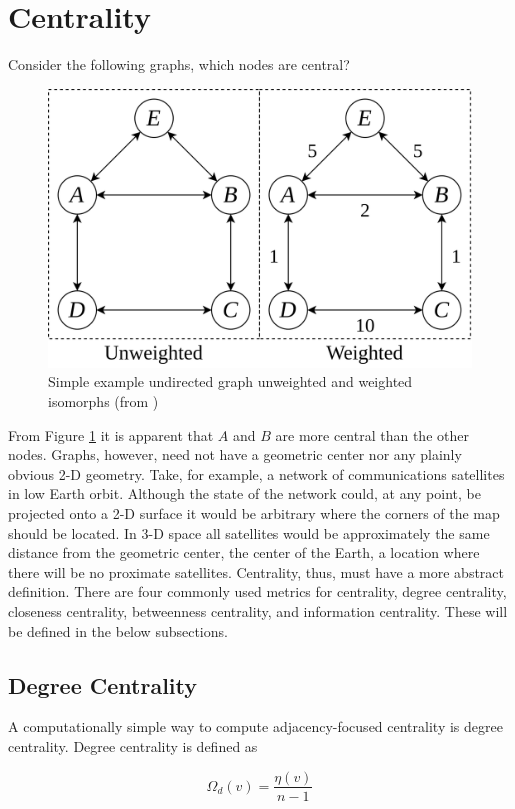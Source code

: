 \section{Centrality}

Consider the following graphs, which nodes are central?

\begin{figure}[H]
	\centering
	\includegraphics[width = .5\linewidth]{figs/simple_graph.png}
	\caption{Simple example undirected graph unweighted and weighted isomorphs (from \cite{Stephenson_1989})}
	\label{fig:simple_graph}
\end{figure}

From Figure \ref{fig:simple_graph} it is apparent that $A$ and $B$ are more central than the other nodes. Graphs, however, need not have a geometric center nor any plainly obvious 2-D geometry. Take, for example, a network of communications satellites in low Earth orbit. Although the state of the network could, at any point, be projected onto a 2-D surface it would be arbitrary where the corners of the map should be located. In 3-D space all satellites would be approximately the same distance from the geometric center, the center of the Earth, a location where there will be no proximate satellites. Centrality, thus, must have a more abstract definition. There are four commonly used metrics for centrality, degree centrality, closeness centrality, betweenness centrality, and information centrality. These will be defined in the below subsections.

\subsection{Degree Centrality}

A computationally simple way to compute adjacency-focused centrality is degree centrality. Degree centrality is defined as

\begin{equation}
	\Omega_d(v) = \frac{\eta(v)}{n - 1}
\end{equation}

